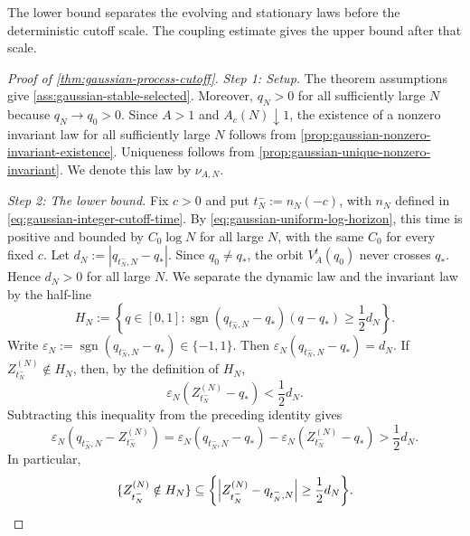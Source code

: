 \documentclass[11pt,reqno,a4paper]{article}
\begin{document}
The lower bound separates the evolving and stationary laws before the
deterministic cutoff scale. The coupling estimate gives the upper bound after
that scale.

\begin{proof}[Proof of \cref{thm:gaussian-process-cutoff}]

  \emph{Step 1: Setup.}
  The theorem assumptions give \cref{ass:gaussian-stable-selected}. Moreover,
  $q_N>0$ for all sufficiently large $N$ because $q_N\to q_0>0$.
  Since $A>1$ and $A_c(N)\downarrow1$, the existence of a nonzero invariant
  law for all sufficiently large $N$ follows from
  \cref{prop:gaussian-nonzero-invariant-existence}. Uniqueness follows from
  \cref{prop:gaussian-unique-nonzero-invariant}. We denote this law by
  $\nu_{A,N}$.

  \emph{Step 2: The lower bound.}
  Fix $c>0$ and put $t_N^-:=n_N(-c)$, with $n_N$ defined in
  \cref{eq:gaussian-integer-cutoff-time}. By
  \cref{eq:gaussian-uniform-log-horizon}, this time is positive and bounded by
  $C_0\log N$ for all large $N$, with the same $C_0$ for every fixed $c$. Let
  $
    d_N:=|{q_{t_N^-,N}-q_\ast}|
  $.
  Since $q_0\neq q_\ast$, the orbit $V_A^t(q_0)$ never crosses $q_\ast$.
  Hence $d_N>0$ for all large $N$. We separate the dynamic law and the
  invariant law by the half-line
  \begin{equation}\label{eq:gaussian-lower-separating-set}
    H_N
    :=
    \left\{
      q\in[0,1]:
      \operatorname{sgn}(q_{t_N^-,N}-q_\ast)(q-q_\ast)
      \geq \frac12 d_N
    \right\}.
  \end{equation}
  Write
  $\varepsilon_N:=\operatorname{sgn}(q_{t_N^-,N}-q_\ast)\in\{-1,1\}$.
  Then
  $
    \varepsilon_N(q_{t_N^-,N}-q_\ast)=d_N
  $.
  If $Z_{t_N^-}^{(N)}\notin H_N$, then, by the definition of $H_N$,
  \begin{equation*}
    \varepsilon_N(Z_{t_N^-}^{(N)}-q_\ast)<\frac12d_N .
  \end{equation*}
  Subtracting this inequality from the preceding identity gives
  \begin{equation*}
    \varepsilon_N(q_{t_N^-,N}-Z_{t_N^-}^{(N)})
    =
    \varepsilon_N(q_{t_N^-,N}-q_\ast)
    -
    \varepsilon_N(Z_{t_N^-}^{(N)}-q_\ast)
    >
    \frac12d_N .
  \end{equation*}
  In particular,
  \begin{equation*}
    \{Z_{t_N^-}^{(N)}\notin H_N\}
    \subseteq
    \left\{
      \abs{Z_{t_N^-}^{(N)}-q_{t_N^-,N}}\geq \frac12 d_N
    \right\}.
  \end{equation*}

\end{proof}
\end{document}
